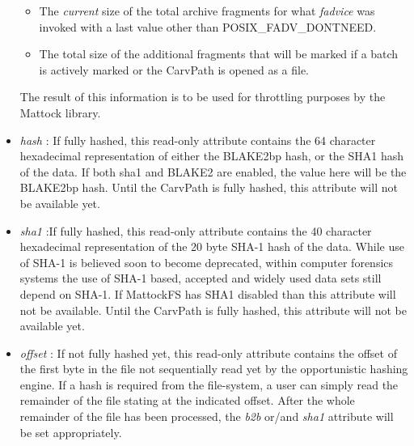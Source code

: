 \begin{itemize}
\begin{itemize} 
\item The \emph{current} size of the total archive fragments for what \emph{fadvice} was invoked with a last value other than POSIX\_FADV\_DONTNEED. 
\item The total size of the additional fragments that will be marked if a batch is actively marked or the CarvPath is opened as a file. 
\end{itemize}
The result of this information is to be used for throttling purposes by the Mattock library.   
\item \emph{hash} : If fully hashed, this read-only attribute contains the 64 character hexadecimal representation of either the BLAKE2bp hash, or the SHA1 hash of the data. If both sha1 and BLAKE2 are enabled, the value here will be the BLAKE2bp hash. Until the CarvPath is fully hashed, this attribute will not be available yet.
\item \emph{sha1} :If fully hashed, this read-only attribute contains the 40 character hexadecimal representation of the 20 byte SHA-1 hash of the data. While use of SHA-1 is believed soon to become deprecated, within computer forensics systems the use of SHA-1 based, accepted and widely used data sets still depend on SHA-1. If MattockFS has SHA1 disabled than this attribute will not be available. Until the CarvPath is fully hashed, this attribute will not be available yet.
\item \emph{offset} : If not fully hashed yet, this read-only attribute contains the offset of the first byte in the file not sequentially read yet by the opportunistic hashing engine. If a hash is required from the file-system, a user can simply read the remainder of the file stating at the indicated offset. After the whole remainder of the file has been processed, the \emph{b2b} or/and \emph{sha1} attribute will be set appropriately.
\end{itemize}

